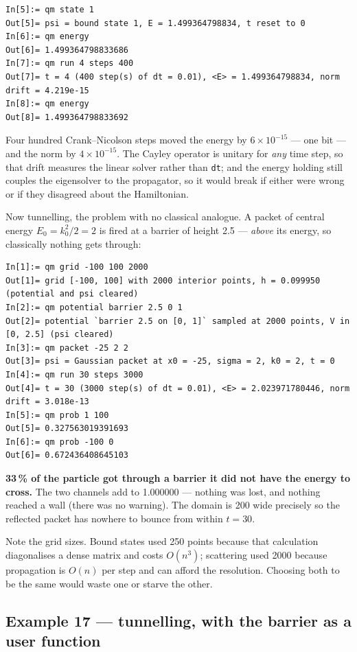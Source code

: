 \documentclass[11pt]{article}
\newcommand{\code}[1]{\texttt{#1}}
\begin{document}
\begin{lstlisting}
In[5]:= qm state 1
Out[5]= psi = bound state 1, E = 1.499364798834, t reset to 0
In[6]:= qm energy
Out[6]= 1.499364798833686
In[7]:= qm run 4 steps 400
Out[7]= t = 4 (400 step(s) of dt = 0.01), <E> = 1.499364798834, norm drift = 4.219e-15
In[8]:= qm energy
Out[8]= 1.499364798833692
\end{lstlisting}

Four hundred Crank--Nicolson steps moved the energy by $6\times10^{-15}$
--- one bit --- and the norm by $4\times10^{-15}$. The Cayley operator is
unitary for \emph{any} time step, so that drift measures the linear
solver rather than \code{dt}; and the energy holding still couples the
eigensolver to the propagator, so it would break if either were wrong or
if they disagreed about the Hamiltonian.

Now tunnelling, the problem with no classical analogue. A packet of
central energy $E_0=k_0^2/2=2$ is fired at a barrier of height 2.5 ---
\emph{above} its energy, so classically nothing gets through:

\begin{lstlisting}
In[1]:= qm grid -100 100 2000
Out[1]= grid [-100, 100] with 2000 interior points, h = 0.099950 (potential and psi cleared)
In[2]:= qm potential barrier 2.5 0 1
Out[2]= potential `barrier 2.5 on [0, 1]` sampled at 2000 points, V in [0, 2.5] (psi cleared)
In[3]:= qm packet -25 2 2
Out[3]= psi = Gaussian packet at x0 = -25, sigma = 2, k0 = 2, t = 0
In[4]:= qm run 30 steps 3000
Out[4]= t = 30 (3000 step(s) of dt = 0.01), <E> = 2.023971780446, norm drift = 3.018e-13
In[5]:= qm prob 1 100
Out[5]= 0.327563019391693
In[6]:= qm prob -100 0
Out[6]= 0.672436408645103
\end{lstlisting}

\textbf{33\,\% of the particle got through a barrier it did not have the
energy to cross.} The two channels add to 1.000000 --- nothing was lost,
and nothing reached a wall (there was no warning). The domain is 200
wide precisely so the reflected packet has nowhere to bounce from within
$t=30$.

Note the grid sizes. Bound states used 250 points because that
calculation diagonalises a dense matrix and costs $O(n^3)$; scattering
used 2000 because propagation is $O(n)$ per step and can afford the
resolution. Choosing both to be the same would waste one or starve the
other.

\subsection{Example 17 --- tunnelling, with the barrier as a user function}
\end{document}

